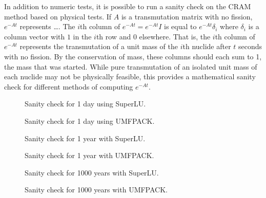 In addition to numeric tests, it is possible to run a sanity check on the CRAM
method based on physical tests. If $A$ is a transmutation matrix with no
fission, $e^{-At}$ represents {\color{red}\ldots}. The $i$th column of
$e^{-At}=e^{-At}I$ is equal to $e^{-At}\delta_{i}$ where $\delta_i$ is a
column vector with $1$ in the $i$th row and $0$ elsewhere. That is, the $i$th
column of $e^{-At}$ represents the transmutation of a unit mass of the $i$th
nuclide after $t$ seconds with no fission. By the conservation of mass, these
columns should each sum to 1, the mass that was started. While pure
transmutation of an isolated unit mass of each nuclide may not be physically
feasible, this provides a mathematical sanity check for different methods of
computing $e^{-At}$.


\begin{figure}[!ht]
\centering
\resizebox{0.9\textwidth}{!}{}
\caption{Sanity check for 1 day using SuperLU.}
\label{fig:nofission-pwru50-1-day-superlu}
\end{figure}

\begin{figure}[!ht]
\centering
\resizebox{0.9\textwidth}{!}{}
\caption{Sanity check for 1 day using UMFPACK.}
\label{fig:nofission-pwru50-1-day-umfpack}
\end{figure}

\begin{figure}[!ht]
\centering
\resizebox{0.9\textwidth}{!}{}
\caption{Sanity check for 1 year with SuperLU.}
\label{fig:nofission-pwru50-1-year-superlu}
\end{figure}

\begin{figure}[!ht]
\centering
\resizebox{0.9\textwidth}{!}{}
\caption{Sanity check for 1 year with UMFPACK.}
\label{fig:nofission-pwru50-1-year-umfpack}
\end{figure}

\begin{figure}[!ht]
\centering
\resizebox{0.9\textwidth}{!}{}
\caption{Sanity check for 1000 years with SuperLU.}
\label{fig:nofission-pwru50-1000-years-superlu}
\end{figure}

\begin{figure}[!ht]
\centering
\resizebox{0.9\textwidth}{!}{}
\caption{Sanity check for 1000 years with UMFPACK.}
\label{fig:nofission-pwru50-1000-years-umfpack}
\end{figure}


